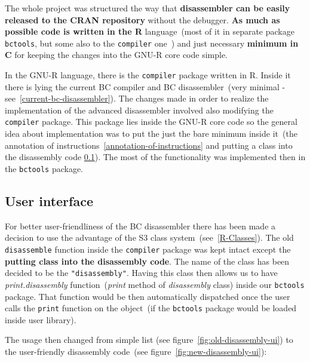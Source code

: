\documentclass[thesis=M,english]{FITthesis}[2018/10/20]
\newcommand{\code}[1]{\texttt{#1}}
\begin{document}
The whole project was structured the way that \textbf{disassembler can be easily released to the CRAN repository} without the debugger. \textbf{As much as possible code is written in the R} language~(most of it in separate package \code{bctools}, but some also to the \code{compiler} one~\label{internal-parts-of-vm}) and just necessary \textbf{minimum in C} for keeping the changes into the GNU-R core code simple.

In the GNU-R language, there is the \code{compiler} package written in R. Inside it there is lying the current BC compiler and BC disassembler~(very minimal - see~\ref{current-bc-disassembler}). The changes made in order to realize the implementation of the advanced disassembler involved also modifying the \code{compiler} package. This package lies inside the GNU-R core code so the general idea about implementation was to put the just the bare minimum inside it~(the annotation of instructions~\ref{annotation-of-instructions} and putting a class into the disassembly code \ref{user-interface}). The most of the functionality was implemented then in the \code{bctools} package.

\subsection{User interface}\label{user-interface}

For better user-friendliness of the BC disassembler there has been made a decision to use the advantage of the S3 class system~(see~\ref{R-Classes}). The old \code{disassemble} function inside the \code{compiler} package was kept intact except the \textbf{putting class into the disassembly code}. The name of the class has been decided to be the \code{"disassembly"}. Having this class then allows us to have \textit{print.disassembly} function~(\textit{print} method of \textit{disassembly} class) inside our \code{bctools} package. That function would be then automatically dispatched once the user calls the \code{print} function on the object~(if the \code{bctools} package would be loaded inside user library).

The usage then changed from simple list (see figure~\ref{fig:old-disassembly-ui}) to the user-friendly disassembly code~(see figure~\ref{fig:new-disassembly-ui}):
\end{document}
